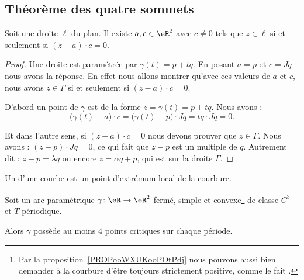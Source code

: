 \subsection{Théorème des quatre sommets}

\begin{lemma}       \label{LEMooELIRooNDVXPh}
	Soit une droite \( \ell\) du plan. Il existe \( a,c\in \eR^2\) avec \( c\neq 0\) tels que \( z\in \ell\) si et seulement si \( (z-a)\cdot c=0\).
\end{lemma}

\begin{proof}
	Une droite est paramétrée par \( \gamma(t)=p+tq\). En posant \( a=p\) et \( c=Jq\) nous avons la réponse. En effet nous allons montrer qu'avec ces valeurs de \( a\) et \( c\), nous avons \( z\in \Gamma\) si et seulement si \( (z-a)\cdot c=0\).

	D'abord un point de \( \gamma\) est de la forme \( z=\gamma(t)=p+tq\). Nous avons :
	\begin{equation}
		\big( \gamma(t)-a \big)\cdot c=\big( \gamma(t)-p \big)\cdot Jq=tq\cdot Jq=0.
	\end{equation}

	Et dans l'autre sens, si \( (z-a)\cdot c=0\) nous devons prouver que \( z\in \Gamma\). Nous avons : \( (z-p)\cdot Jq=0\), ce qui fait que \( z-p\) est un multiple de \( q\). Autrement dit : \( z-p=\lambda q\) ou encore \( z=\alpha q+p\), qui est sur la droite \( \Gamma\).
\end{proof}

\begin{definition}
	Un  d'une courbe est un point d'extrémum local de la courbure.
\end{definition}

\begin{theorem}       \label{THOooFRBBooWKZcfY}
	Soit un arc paramétrique \( \gamma\colon \eR\to \eR^2\) fermé, simple et convexe\footnote{Par la proposition~\ref{PROPooWXUKooPOtPdj} nous pouvons aussi bien demander à la courbure d'être toujours strictement positive, comme le fait \cite{KXjFWKA}.} de classe \( C^3\) et \( T\)-périodique.

	Alors \( \gamma\) possède au moins \( 4\) points critiques sur chaque période.
\end{theorem}

